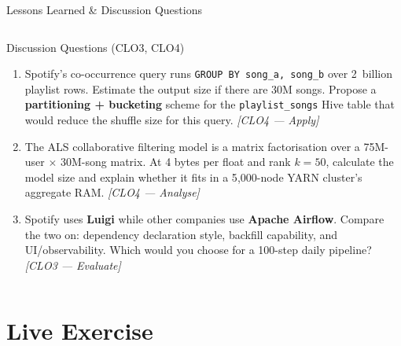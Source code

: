 \documentclass[aspectratio=169,10pt]{beamer}
\begin{document}
\begin{frame}{Lessons Learned \& Discussion Questions}
\begin{columns}[T]
      \begin{alertblock}{Discussion Questions \textmd{\tiny (CLO3, CLO4)}}
        \begin{enumerate}
          \item Spotify's co-occurrence query runs
                \texttt{GROUP BY song\_a, song\_b} over 2~billion
                playlist rows.
                Estimate the output size if there are 30M songs.
                Propose a \textbf{partitioning + bucketing} scheme
                for the \texttt{playlist\_songs} Hive table that
                would reduce the shuffle size for this query.
                \textit{[CLO4 — Apply]}
          \item The ALS collaborative filtering model is a matrix
                factorisation over a 75M-user $\times$ 30M-song matrix.
                At 4 bytes per float and rank $k=50$, calculate
                the model size and explain whether it fits in a
                5{,}000-node YARN cluster's aggregate RAM.
                \textit{[CLO4 — Analyse]}
          \item Spotify uses \textbf{Luigi} while other companies
                use \textbf{Apache Airflow}.
                Compare the two on: dependency declaration style,
                backfill capability, and UI/observability.
                Which would you choose for a 100-step daily pipeline?
                \textit{[CLO3 — Evaluate]}
        \end{enumerate}
      \end{alertblock}
  \end{columns}
\end{frame}

\section{Live Exercise}
\end{document}
